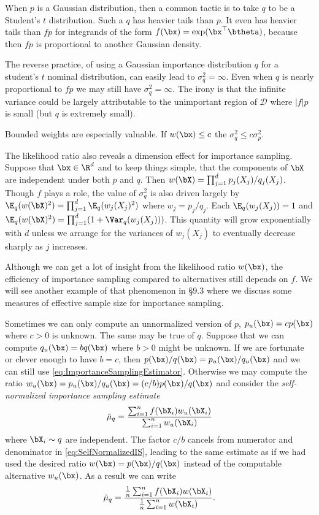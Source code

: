 When \(p\) is a Gaussian distribution, then a common tactic is to take \(q\) to be a Student's \(t\) distribution. Such a \(q\) has heavier tails than \(p\). It even has heavier tails than \(fp\) for integrands of the form \(f(\bx) = \exp(\bx^\top \btheta)\), because then \(fp\) is proportional to another Gaussian density.

The reverse practice, of using a Gaussian importance distribution \(q\) for a student's \(t\) nominal distribution, can easily lead to \(\sigma_q^2 = \infty\). Even when \(q\) is nearly proportional to \(fp\) we may still have \(\sigma_q^2 = \infty\). The irony is that the infinite variance could be largely attributable to the unimportant region of \(\mathcal{D}\) where \(|f|p\) is small (but \(q\) is extremely small).

Bounded weights are especially valuable. If \(w(\bx) \leq c\) the \(\sigma_q^2 \leq c \sigma_p^2\).

The likelihood ratio also reveals a dimension effect for importance sampling. Suppose that \(\bx \in \R^d\) and to keep things simple, that the components of \(\bX\) are independent under both \(p\) and \(q\). Then \(w(\bX) = \prod_{j=1}^d p_j(X_j)/q_j(X_j)\). Though \(f\) plays a role, the value of \(\sigma_q^2\) is also driven largely by \(\E_q(w(\bX)^2) = \prod_{j=1}^d \E_q(w_j(X_j)^2)\) where \(w_j = p_j/q_j\). Each \(\E_q(w_j(X_j)) = 1\) and \(\E_q(w(\bX)^2) = \prod_{j=1}^d (1 + \Var_q(w_j(X_j)))\). This quantity will grow exponentially with \(d\) unless we arrange for the variances of \(w_j(X_j)\) to eventually decrease sharply as \(j\) increases.

Although we can get a lot of insight from the likelihood ratio \(w(\bx)\), the efficiency of importance sampling compared to alternatives still depends on \(f\). We will see another example of that phenomenon in \S 9.3 where we discuss some measures of effective sample size for importance sampling.

Sometimes we can only compute an unnormalized version of \(p\), \(p_u(\bx) = cp(\bx)\) where \(c > 0\) is unknown. The same may be true of \(q\). Suppose that we can compute \(q_u(\bx) = bq(\bx)\) where \(b > 0\) might be unknown. If we are fortunate or clever enough to have \(b = c\), then \(p(\bx)/q(\bx) = p_u(\bx)/q_u(\bx)\) and we can still use \eqref{eq:ImportanceSamplingEstimator}. Otherwise we may compute the ratio \(w_u(\bx) = p_u(\bx)/q_u(\bx) = (c/b)p(\bx)/q(\bx)\) and consider the \textit{self-normalized importance sampling estimate}
\begin{equation}
	\tilde{\mu}_q = \frac{\sum_{i=1}^n f(\bX_i)w_u(\bX_i)}{\sum_{i=1}^n w_u(\bX_i)}
	\label{eq:SelfNormalizedIS}
\end{equation}
where \(\bX_i \sim q\) are independent. The factor \(c/b\) cancels from numerator and denominator in \eqref{eq:SelfNormalizedIS}, leading to the same estimate as if we had used the desired ratio \(w(\bx) = p(\bx)/q(\bx)\) instead of the computable alternative \(w_u(\bx)\). As a result we can write
\begin{equation}
	\tilde{\mu}_q = \frac{\frac{1}{n} \sum_{i=1}^n f(\bX_i)w(\bX_i)}{\frac{1}{n} \sum_{i=1}^n w(\bX_i)}.
	\label{eq:SelfNormalizedISStandard}
\end{equation}

